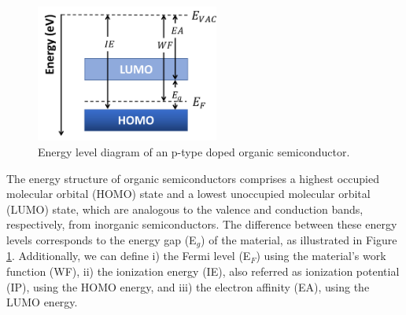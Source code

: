 \begin{figure}[ht]
  \centering
  \includegraphics[width=6cm]{Images/pdf/ediagram.pdf}
  \caption[Energy level diagram of organic semiconductors]{Energy level diagram of an p-type doped organic semiconductor.}
  \label{fig:ediag}
\end{figure}

The energy structure of organic semiconductors comprises a highest occupied molecular orbital (HOMO) state and a lowest unoccupied molecular orbital (LUMO) state, which are analogous to the valence and conduction bands, respectively, from inorganic semiconductors. The difference between these energy levels corresponds to the energy gap (E$_{g}$) of the material, as illustrated in Figure \ref{fig:ediag}. Additionally, we can define i) the Fermi level (E$_{F}$) using the material's work function (WF), ii) the ionization energy (IE), also referred as ionization potential (IP), using the HOMO energy, and iii) the electron affinity (EA), using the LUMO energy.



